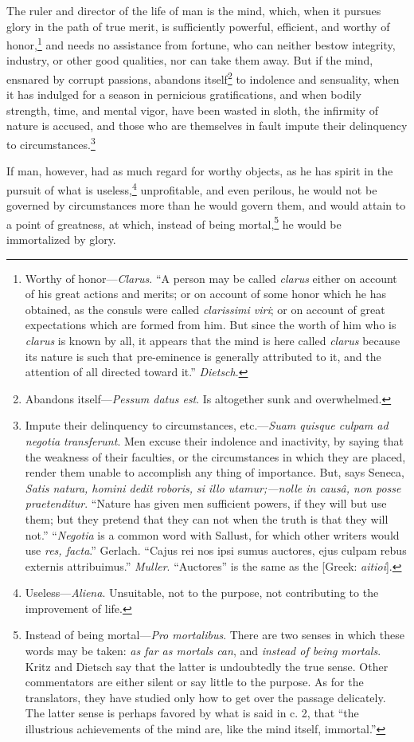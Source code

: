 The ruler and director of the life of man is the mind, which, when it
pursues glory in the path of true merit, is sufficiently powerful,
efficient, and worthy of honor,\footnote{Worthy of honor—\emph{Clarus}. ``A person may be called \emph{clarus}
either on account of his great actions and merits; or on account of
some honor which he has obtained, as the consuls were called
\emph{clarissimi viri}; or on account of great expectations which are
formed from him. But since the worth of him who is \emph{clarus} is known
by all, it appears that the mind is here called \emph{clarus} because its
nature is such that pre-eminence is generally attributed to it, and
the attention of all directed toward it.'' \emph{Dietsch}.} and needs no assistance from
fortune, who can neither bestow integrity, industry, or other good
qualities, nor can take them away. But if the mind, ensnared by
corrupt passions, abandons itself\footnote{Abandons itself—\emph{Pessum datus est}. Is altogether sunk and
overwhelmed.} to indolence and sensuality, when
it has indulged for a season in pernicious gratifications, and when
bodily strength, time, and mental vigor, have been wasted in sloth,
the infirmity of nature is accused, and those who are themselves in
fault impute their delinquency to circumstances.\footnote{Impute their delinquency to circumstances, etc.—\emph{Suam quisque
culpam ad negotia transferunt}. Men excuse their indolence and
inactivity, by saying that the weakness of their faculties, or the
circumstances in which they are placed, render them unable to
accomplish any thing of importance. But, says Seneca, \emph{Satis natura,
homini dedit roboris, si illo utamur;—nolle in causâ, non posse
praetenditur}. ``Nature has given men sufficient powers, if they will
but use them; but they pretend that they can not when the truth is
that they will not.'' ``\emph{Negotia} is a common word with Sallust, for
which other writers would use \emph{res, facta}.'' Gerlach. ``Cajus rei nos
ipsi sumus auctores, ejus culpam rebus externis attribuimus.''
\emph{Muller}. ``Auctores'' is the same as the [Greek: \emph{aitioi}].}

If man, however, had as much regard for worthy objects, as he has
spirit in the pursuit of what is useless,\footnote{Useless—\emph{Aliena}. Unsuitable, not to the purpose, not
contributing to the improvement of life.} unprofitable, and even
perilous, he would not be governed by circumstances more than he would
govern them, and would attain to a point of greatness, at which,
instead of being mortal,\footnote{Instead of being mortal—\emph{Pro mortalibus}. There are two senses
in which these words may be taken: \emph{as far as mortals can}, and
\emph{instead of being mortals}. Kritz and Dietsch say that the latter is
undoubtedly the true sense. Other commentators are either silent or
say little to the purpose. As for the translators, they have studied
only how to get over the passage delicately. The latter sense is
perhaps favored by what is said in c. 2, that ``the illustrious
achievements of the mind are, like the mind itself, immortal.''} he would be immortalized by glory.

